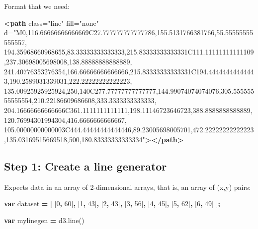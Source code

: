 \documentclass[openany]{book}
\newenvironment{Shaded}{\begin{snugshade}}{\end{snugshade}}
\newcommand{\AttributeTok}[1]{\textcolor[rgb]{0.77,0.63,0.00}{#1}}
\newcommand{\DecValTok}[1]{\textcolor[rgb]{0.00,0.00,0.81}{#1}}
\newcommand{\KeywordTok}[1]{\textcolor[rgb]{0.13,0.29,0.53}{\textbf{#1}}}
\newcommand{\NormalTok}[1]{#1}
\newcommand{\OperatorTok}[1]{\textcolor[rgb]{0.81,0.36,0.00}{\textbf{#1}}}
\newcommand{\OtherTok}[1]{\textcolor[rgb]{0.56,0.35,0.01}{#1}}
\newcommand{\StringTok}[1]{\textcolor[rgb]{0.31,0.60,0.02}{#1}}
\newcommand{\VariableTok}[1]{\textcolor[rgb]{0.00,0.00,0.00}{#1}}
\begin{document}
Format that we need:

\begin{Shaded}
\begin{Highlighting}[]
\KeywordTok{<path}\OtherTok{ class=}\StringTok{"line"}\OtherTok{ fill=}\StringTok{"none"}\OtherTok{ d=}\StringTok{"M0,116.66666666666669C27.777777777777786,155.5131766381766,55.55555555555557, 194.35968660968655,83.33333333333333,215.83333333333331C111.11111111111109,237.30698005698008,138.88888888888889,}
\StringTok{241.40776353276354,166.66666666666666,215.83333333333331C194.44444444444443,190.2589031339031,222.22222222222223,}
\StringTok{135.00925925925924,250,140C277.77777777777777,144.99074074074076,305.55555555555554,210.22186609686608,333.3333333333333,}
\StringTok{204.16666666666666C361.1111111111111,198.11146723646723,388.8888888888889,120.76994301994304,416.6666666666667,}
\StringTok{105.00000000000003C444.44444444444446,89.23005698005701,472.22222222222223,135.03169515669518,500,180.83333333333334"}\KeywordTok{></path>}
\end{Highlighting}
\end{Shaded}

\hypertarget{step-1-create-a-line-generator}{%
\subsection{Step 1: Create a line generator}\label{step-1-create-a-line-generator}}

Expects data in an array of 2-dimensional arrays, that is, an array of (x,y) pairs:

\begin{Shaded}
\begin{Highlighting}[]
\KeywordTok{var}\NormalTok{ dataset }\OperatorTok{=}\NormalTok{ [ [}\DecValTok{0}\OperatorTok{,} \DecValTok{60}\NormalTok{]}\OperatorTok{,}\NormalTok{ [}\DecValTok{1}\OperatorTok{,} \DecValTok{43}\NormalTok{]}\OperatorTok{,}\NormalTok{ [}\DecValTok{2}\OperatorTok{,} \DecValTok{43}\NormalTok{]}\OperatorTok{,}\NormalTok{ [}\DecValTok{3}\OperatorTok{,} \DecValTok{56}\NormalTok{]}\OperatorTok{,}\NormalTok{ [}\DecValTok{4}\OperatorTok{,} \DecValTok{45}\NormalTok{]}\OperatorTok{,}\NormalTok{ [}\DecValTok{5}\OperatorTok{,} \DecValTok{62}\NormalTok{]}\OperatorTok{,}\NormalTok{ [}\DecValTok{6}\OperatorTok{,} \DecValTok{49}\NormalTok{] ]}\OperatorTok{;}

\KeywordTok{var}\NormalTok{ mylinegen }\OperatorTok{=} \VariableTok{d3}\NormalTok{.}\AttributeTok{line}\NormalTok{()}
\end{Highlighting}
\end{Shaded}
\end{document}
